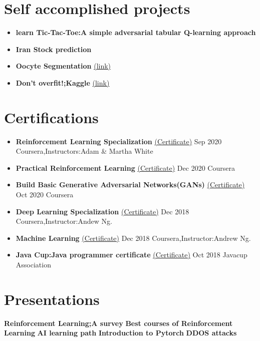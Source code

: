 \documentclass[paper=a4,fontsize=11pt]{scrartcl} %
\newcommand{\dline}{\newline \newline}
\newcommand{\NewPart}[1]{\section*{{#1}}}
\begin{document}
\NewPart{Self accomplished projects}
\begin{itemize}
    
    \item \textbf{learn Tic-Tac-Toe:A simple adversarial tabular Q-learning approach}
    \item \textbf{Iran Stock prediction}
    \item \textbf{Oocyte Segmentation } \href{https://colab.research.google.com/drive/1zIRFSCfcLPRucaLF2GXegeOdCgjLZYTA?usp=sharing}{(link)}   
     \item \textbf{Don't overfit!;Kaggle} \href{https://colab.research.google.com/drive/1KByeRkWlJtuq1nUBYs_46Rt4cpdRRW2M?usp=sharing}{(link)}

\end{itemize}
\NewPart{Certifications}
\begin{itemize}

\item \small \textbf{Reinforcement Learning Specialization} \href{http://coursera.org/verify/specialization/S4WB3X7GUWS3}{(Certificate)} \hfill Sep 2020 \newline
\footnotesize Coursera,Instructors:Adam \& Martha White
\item \small \textbf{Practical Reinforcement Learning} \href{http://coursera.org/verify/XNZUDEGL2W76}{(Certificate)} \hfill Dec 2020 \newline
Coursera
\item \small \textbf{Build Basic Generative Adversarial Networks(GANs)} \href{http://coursera.org/verify/XH3W8DC5DYV6}{(Certificate)} \hfill Oct 2020 \newline
Coursera
\item \small \textbf{Deep Learning Specialization} \href{}{(Certificate)} \hfill Dec 2018 \newline
\footnotesize Coursera,Instructor:Andew Ng. 
\item \small \textbf{Machine Learning} \href{}{(Certificate)} \hfill Dec 2018 \newline
\footnotesize Coursera,Instructor:Andrew Ng. 
\item \small \textbf{Java Cup:Java programmer certificate} \href{https://drive.google.com/file/d/1YTwEyrwLsdsbC-Hfo7t-j1eJyuE6mVdi/view?usp=sharing}{(Certificate)} \hfill Oct 2018 \newline
Javacup Association
\end{itemize}
\NewPart{Presentations}
\textbf{Reinforcement Learning;A survey} \dline
\textbf{Best courses of Reinforcement Learning} \dline
\textbf{AI learning path} \dline
\textbf{Introduction to Pytorch} \dline
\textbf{DDOS attacks} \dline
\end{document}
